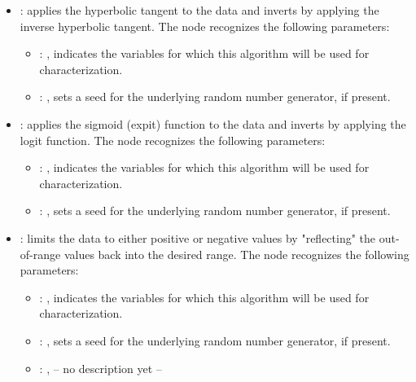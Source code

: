 \begin{itemize}
    \item {}:
      applies the hyperbolic tangent to the data and inverts by applying the
      inverse hyperbolic tangent.
      The  node recognizes the following parameters:
        \begin{itemize}
          \item {}: , 
            indicates the variables for which this algorithm will be used for characterization.
          \item {}: , 
            sets a seed for the underlying random number generator, if present.
      \end{itemize}

    \item {}:
      applies the sigmoid (expit) function to the data and inverts by applying
      the logit function.
      The  node recognizes the following parameters:
        \begin{itemize}
          \item {}: , 
            indicates the variables for which this algorithm will be used for characterization.
          \item {}: , 
            sets a seed for the underlying random number generator, if present.
      \end{itemize}

    \item {}:
      limits the data to either positive or negative values by "reflecting" the
      out-of-range values back into the desired range.
      The  node recognizes the following parameters:
        \begin{itemize}
          \item {}: , 
            indicates the variables for which this algorithm will be used for characterization.
          \item {}: , 
            sets a seed for the underlying random number generator, if present.
          \item {}: , 
            -- no description yet --
      \end{itemize}


\end{itemize}
